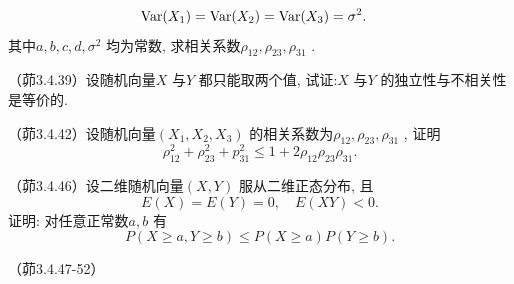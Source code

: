 \begin{problemset}[错题记录]
\begin{align*}
         & \operatorname{Var}(X_1)=\operatorname{Var}(X_2)=\operatorname{Var}(X_3)=\sigma^2.
    \end{align*}
    其中$a, b, c, d, \sigma^{2}$ 均为常数, 求相关系数$\rho_{12},\rho_{23},\rho_{31}$ .
    \item （茆3.4.39）设随机向量$X$ 与$Y$ 都只能取两个值, 试证:$X$ 与$Y$ 的独立性与不相关性是等价的.
    \item （茆3.4.42）设随机向量$(X_1,X_2,X_3)$ 的相关系数为$\rho_{12},\rho_{23},\rho_{31}$ , 证明
    \begin{equation*}
        \rho_{12}^{2}+\rho_{23}^{2}+p_{31}^{2} \leqslant 1+2 \rho_{12} \rho_{23} \rho_{31}.
    \end{equation*}
    \item （茆3.4.46）设二维随机向量$(X,Y)$ 服从二维正态分布, 且
    \begin{equation*}
        E(X)=E(Y)=0, \quad E(X Y)<0.
    \end{equation*}
    证明: 对任意正常数$a,b$ 有
    \begin{equation*}
        P(X \geqslant a, Y \geqslant b) \leqslant P(X \geqslant a) P(Y \geqslant b).
    \end{equation*}
    \item （茆3.4.47-52）
\end{problemset}
